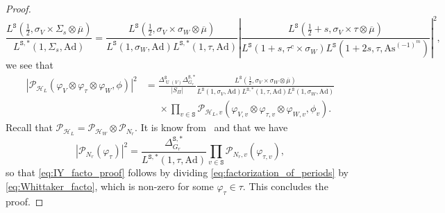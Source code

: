 \documentclass[letterpaper,11pt]{amsart}
\newcommand{\cH}{\mathcal{H}}
\newcommand{\cP}{\mathcal{P}}
\newcommand{\tS}{\mathtt{S}}
\newcommand{\<}{\negthickspace}
\newcommand{\valP}[1]{\left|#1\right|}
\DeclareMathOperator{\U}{U}
\theoremstyle{definition}
\theoremstyle{plain}
\theoremstyle{remark}
\numberwithin{equation}{section}
\begin{document}
\begin{proof}
\begin{equation*}
    \frac{L^\tS(\frac{1}{2},\sigma_V \times \Sigma_s \otimes \overline{\mu})}{L^{\tS,*}(1,\Sigma_s,\mathrm{Ad})}=\frac{L^\tS(\frac{1}{2},\sigma_V \times \sigma_W \otimes \overline{\mu})}{L^{\tS}(1,\sigma_W,\mathrm{Ad})L^{\tS,*}(1,\tau,\mathrm{Ad})}\valP{\frac{L^\tS(\frac{1}{2}+s,\sigma_V \times \tau  \otimes \overline{\mu})}{L^\tS(1+s, \tau^{c} \times  \sigma_W  )L^{\tS}(1+2s,\tau,\mathrm{As}^{(-1)^{m}})}}^2,
\end{equation*}
we see that 
\begin{align}
\label{eq:factorization_of_periods}
    \valP{\cP_{\cH_L}(\varphi_V \otimes \varphi_\tau \otimes \varphi_W  , \phi)}^2 & =\frac{\Delta_{\U(V)}^\tS \Delta_{G_r}^{\tS,*}}{|S_\Pi|}  \frac{L^\tS(\frac{1}{2},\sigma_V \times \sigma_{W}  \otimes \overline{\mu})}{L^\tS(1, \sigma_{V}, \mathrm{Ad})L^{\tS,*}(1, \tau, \mathrm{Ad})L^\tS(1, \sigma_{W}, \mathrm{Ad})} \\
    & \; \; \; \; \;  \times  \prod_{v\in \tS} \cP_{\cH_L,v}(\varphi_{V,v} \otimes  \varphi_{\tau,v} \otimes  \varphi_{W,v},  \phi_v). \nonumber
\end{align}
Recall that $\cP_{\cH_L}=\cP_{\cH_W} \otimes \cP_{N_r}$. It is know from~\cite{FLO12} and \cite{CS80} that we have
\begin{equation}
\label{eq:Whittaker_facto}
    \valP{\cP_{N_r}(\varphi_\tau)}^2=\frac{\Delta_{G_r}^{\tS,*}}{L^{\tS,*}(1,\tau,\mathrm{Ad})} \prod_{v \in \tS }\cP_{N_r,v}(\varphi_{\tau,v}),
\end{equation}
so that \eqref{eq:IY_facto_proof} follows by dividing \eqref{eq:factorization_of_periods} by \eqref{eq:Whittaker_facto}, which is non-zero for some $\varphi_\tau \in \tau$. This concludes the proof.

\end{proof}
\end{document}
